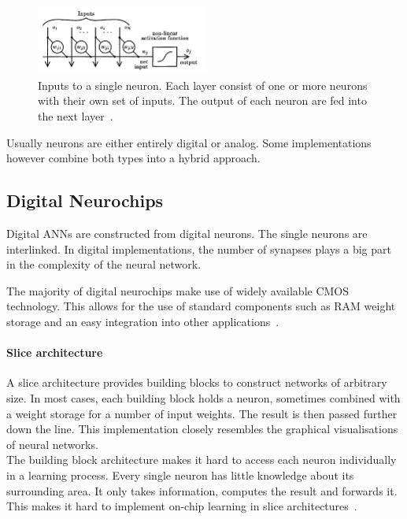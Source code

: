\documentclass[conference]{IEEEtran}
\begin{document}
    \begin{figure}[h]
        \centering
        \includegraphics[width=0.5\textwidth]{resources/network-layer.png}
        \caption{Inputs to a single neuron.
        Each layer consist of one or more neurons with their own set of inputs.
        The output of each neuron are fed into the next layer~\cite[Fig.~1]{ms1990digital}.}
        \label{fig:layer}
    \end{figure}

    Usually neurons are either entirely digital or analog.
    Some implementations however combine both types into a hybrid approach.

    \subsection{Digital Neurochips}


    Digital ANNs are constructed from digital neurons.
    The single neurons are interlinked.
    In digital implementations, the number of synapses plays a big part in the complexity of the neural network.

    The majority of digital neurochips make use of widely available CMOS technology.
    This allows for the use of standard components such as RAM weight storage and an easy integration into other applications~\cite{dias2004artificial}.

    \paragraph{Slice architecture}
    A slice architecture provides building blocks to construct networks of arbitrary size.
    In most cases, each building block holds a neuron, sometimes combined with a weight storage for a number of input weights.
    The result is then passed further down the line.
    This implementation closely resembles the graphical visualisations of neural networks.\\
    The building block architecture makes it hard to access each neuron individually in a learning process.
    Every single neuron has little knowledge about its surrounding area.
    It only takes information, computes the result and forwards it.
    This makes it hard to implement on-chip learning in slice architectures~\cite{dias2004artificial}.
\end{document}
